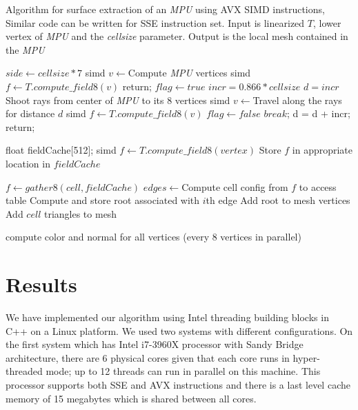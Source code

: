 \begin{algorithm}
\caption{Algorithm for surface extraction of an \textit{MPU} using AVX SIMD instructions,
Similar code can be written for SSE instruction set. 
Input is linearized \blob $T$, lower vertex of \textit{MPU} and the \textit{cellsize} parameter. 
Output is the local mesh contained in the \textit{MPU}}
\label{alg:surfaceextraction}
\begin{algorithmic}[1]		
	\STATE $side \gets cellsize*7$
	\STATE simd $v \gets $Compute \textit{MPU} vertices
	\STATE simd $f \gets T.compute\_field8(v)$
	  \STATE return;
	  \ENDIF	
	\ELSE 
	  \STATE $flag \gets true$
	  \STATE $incr = 0.866*cellsize$	  
	  \STATE $d = incr$
	  \STATE Shoot rays from center of \textit{MPU} to its 8 vertices
	  \STATE simd $v \gets $Travel along the rays for distance $d$     
	  \STATE simd $f \gets T.compute\_field8(v)$
	  \STATE $flag \gets false$
	  \STATE $break$;
	  \ENDIF
	  \STATE d = d + incr;
	  \ENDWHILE	
	  \STATE return;
	  \ENDIF	
	\ENDIF	
	
	\STATE float fieldCache[512];
	\STATE simd $f \gets T.compute\_field8(vertex)$
	\STATE Store $f$ in appropriate location in $fieldCache$
	\ENDFOR
	
	
		\STATE $f \gets gather8(cell, fieldCache)$
		\STATE $edges \gets $Compute cell config from $f$ to access table
			\STATE Compute and store root associated with $i$th edge		
			\STATE Add root to mesh vertices
			\ENDIF
		\ENDFOR				
		\STATE Add $cell$ triangles to mesh
	\ENDFOR	
	
	\STATE compute color and normal for all vertices (every 8 vertices in parallel)
\end{algorithmic}
\end{algorithm}


\section{Results}\label{sec:results}
We have implemented our algorithm using Intel threading building blocks in C++ on a Linux platform. We used two systems with 
different configurations. On the first system which has Intel i7-3960X processor with Sandy Bridge architecture, there are 6 
physical cores given that each core runs in hyper-threaded mode; up to 12 threads can run in parallel on this machine. 
This processor supports both SSE and AVX instructions and there is a last level cache memory of 15 megabytes 
which is shared between all cores.

